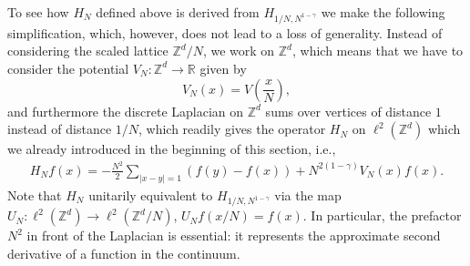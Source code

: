 \documentclass[12pt, reqno]{amsart}
\theoremstyle{definition}
\numberwithin{equation}{section}
\newcommand{\Z}{{\mathbb Z}}
\newcommand{\R}{{\mathbb R}}
\begin{document}
To see how $H_N$ defined above is derived from $  {  H_{1/N,N^{1-\gamma}}}$ we make the following simplification, which, however, does not lead to a loss of generality. Instead of considering the scaled lattice $\Z^d/N$, we work on $\Z^d$, which means that we have to consider the potential $V_N:\Z^d\to \R$ given by 
$$V_N(x) =V\left(\frac{x}{N}\right),$$
and furthermore the discrete Laplacian on $\Z^d$ sums over vertices of distance $1$ instead of distance $1/N$, which readily gives the operator $H_N$ on  $\ell^2(\mathbb{Z}^d )$ which we already introduced in the beginning of this section, i.e.,
\begin{align*}\label{generic hamiltonian}
     H_{N}f(x)=-\frac{N^2}{2}\sum_{|x-y|= 1}(f(y)-f(x))+N^{2(1-\gamma)}V_N(x)f(x).
 \end{align*}
Note that $H_N$ unitarily equivalent to $   {  H_{1/N,N^{1-\gamma}}}$ via the map $U_N:\ell^2(\Z^d)\to \ell^2(\Z^d/N)$, $U_Nf(x/N)=f(x)$. In particular, the prefactor $N^2$ in front of the Laplacian is essential: it represents the approximate second derivative of a function in the continuum.
\end{document}
